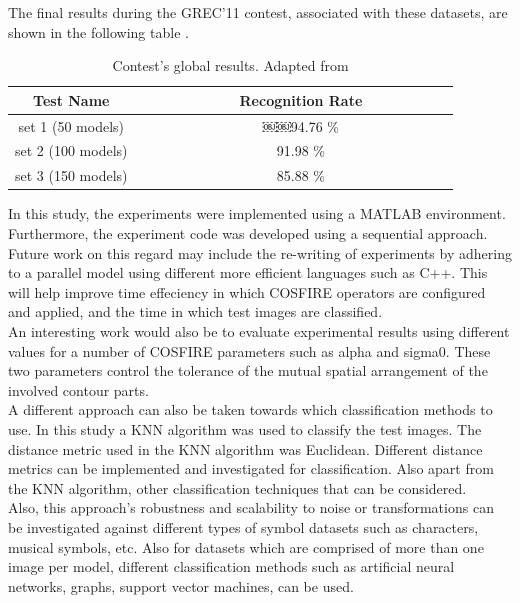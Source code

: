 The final results during the GREC'11 contest, associated with these datasets, are shown in the following table \cite{Delalandre_2012}.

\begin{table}[h]
\centering
\caption{Contest's global results. Adapted from \cite{Delalandre_2012}}
\begin{tabular}{ccccccccccccccc}
  \hline
      Test Name & & & & & & & & Recognition Rate \\
  \hline
      set 1 (50 models) & & & & & & & &  ￼￼94.76 \% \\
      set 2 (100 models) & & & & & & & &  91.98 \% \\
      set 3 (150 models) & & & & & & & &  85.88 \% \\

  \hline
\end{tabular}
\end{table}


In this study, the experiments were implemented using a MATLAB environment. Furthermore, the experiment code was developed using a sequential approach. Future work on this regard may include the re-writing of experiments by adhering to a parallel model using different more efficient languages such as C++. This will help improve time effeciency in which COSFIRE operators are configured and applied, and the time in which test images are classified. \\

An interesting work would also be to evaluate experimental results using different values for a number of COSFIRE parameters such as alpha and sigma0. These two parameters control the tolerance of the mutual spatial arrangement of the involved contour parts.\\

A different approach can also be taken towards which classification methods to use. In this study a KNN algorithm was used to classify the test images. The distance metric used in the KNN algorithm was Euclidean. Different distance metrics can be implemented and investigated for classification. Also apart from the KNN algorithm, other classification techniques that can be considered. \\

Also, this approach's robustness and scalability to noise or transformations can be investigated against different types of symbol datasets such as characters, musical symbols, etc. Also for datasets which are comprised of more than one image per model, different classification methods such as artificial neural networks, graphs, support vector machines, can be used. \\




